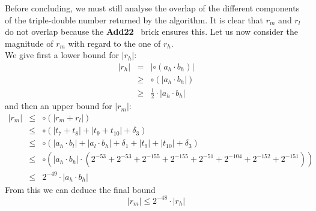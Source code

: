 \documentclass[a4paper,10pt,twoside]{article}
\newenvironment{proof}[1][Proof]{\begin{trivlist}
\item[\hskip \labelsep {\bfseries #1}]}{\end{trivlist}}
\newcommand{\qed}{\nobreak \ifvmode \relax \else \ifdim \lastskip<1.5em \hskip-\lastskip
\hskip1.5em plus0em minus0.5em \fi \nobreak \vrule height0.75em width0.5em depth0.25em\fi}
\newcommand{\hi}{\ensuremath{\mathit{h}}}
\newcommand{\mi}{\ensuremath{\mathit{m}}}
\newcommand{\lo}{\ensuremath{\mathit{l}}}
\newcommand{\AddDD}{{\bf Add22}}
\begin{document}
\begin{proof}
Before concluding, we must still analyse the overlap of the different components of the triple-double number returned
by the algorithm. It is clear that $r_\mi$ and $r_\lo$ do not overlap because the \AddDD~ brick ensures this.
Let us now consider the magnitude of $r_\mi$ with regard to the one of $r_\hi$.\\
We give first a lower bound for $\left \vert r_\hi \right \vert$:
\begin{eqnarray*}
\left \vert r_\hi \right \vert & = & \left \vert \circ \left( a_\hi \cdot b_\hi \right) \right \vert \\
& \geq & \circ \left( \left \vert a_\hi \cdot b_\hi \right \vert \right) \\
& \geq & \frac{1}{2} \cdot \left \vert a_\hi \cdot b_\hi \right \vert
\end{eqnarray*}
and then an upper bound for $\left \vert r_\mi \right \vert$:
\begin{eqnarray*}
\left \vert r_\mi \right \vert & \leq & \circ \left( \left \vert r_\mi + r_\lo \right \vert \right) \\
& \leq & \circ \left( \left \vert t_7 + t_8 \right \vert + \left \vert t_9 + t_{10} \right \vert + \delta_3 \right) \\
& \leq & \circ \left( \left \vert a_\hi \cdot b_\lo \right \vert + \left \vert a_\lo \cdot b_\hi \right \vert + \delta_1 +
                      \left \vert t_9 \right \vert + \left \vert t_{10} \right \vert + \delta_3 \right) \\
& \leq & \circ \left( \left \vert a_\hi \cdot b_\hi \right \vert \cdot \left(
                      2^{-53} + 2^{-53} + 2^{-155} + 2^{-155} + 2^{-51} + 2^{-104} + 2^{-152} + 2^{-151} \right) \right) \\
& \leq & 2^{-49} \cdot \left \vert a_\hi \cdot b_\hi \right \vert
\end{eqnarray*}
From this we can deduce the final bound
$$\left \vert r_\mi \right \vert \leq 2^{-48} \cdot \left \vert r_\hi \right \vert$$\qed
\end{proof}
\end{document}
